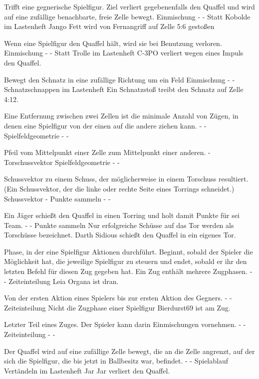 {Trifft eine gegnerische Spielfigur. Ziel verliert gegebenenfalls den Quaffel und wird auf eine zufällige benachbarte, freie Zelle bewegt.}
{Einmischung}
{-}
{-}
{Statt \glqq{}Kobolde\grqq{}  im Lastenheft}
{Jango Fett wird von Fernangriff auf Zelle 5:6 gestoßen}

{Wenn eine Spielfigur den Quaffel hält, wird sie bei Benutzung verloren.}
{Einmischung}
{-}
{-}
{Statt \glqq{}Trolle\grqq{}  im Lastenheft}
{C-3PO verliert wegen eines Impuls den Quaffel.}

{Bewegt den Schnatz in eine zufällige Richtung um ein Feld}
{Einmischung}
{-}
{-}
{\glqq{}Schnatzschnappen\grqq{}  im Lastenheft}
{Ein Schnatzstoß treibt den Schnatz auf Zelle 4:12.}

{Eine Entfernung zwischen zwei Zellen ist die minimale Anzahl von Zügen, in denen eine Spielfigur von der einen auf die andere ziehen kann.}
{-}
{-}
{Spielfeldgeometrie}
{-}
{-}

{Pfeil vom Mittelpunkt einer Zelle zum Mittelpunkt einer anderen.}
{-}
{Torschussvektor}
{Spielfeldgeometrie}
{-}
{-}

{Schussvektor zu einem Schuss, der möglicherweise in einem Torschuss resultiert. (Ein Schussvektor, der die linke oder rechte Seite eines Torrings schneidet.)}
{Schussvektor}
{-}
{Punkte sammeln}
{-}
{-}

{Ein Jäger schießt den Quaffel in einen Torring und holt damit Punkte für sei Team.}
{-}
{-}
{Punkte sammeln}
{Nur erfolgreiche Schüsse auf das Tor werden als Torschüsse bezeichnet.}
{Darth Sidious schießt den Quaffel in ein eigenes Tor.}

{Phase, in der eine Spielfigur Aktionen durchführt. Beginnt, sobald der Spieler die Möglichkeit hat, die jeweilige Spielfigur zu steuern und endet, sobald er ihr den letzten Befehl für diesen Zug gegeben hat. Ein Zug enthält mehrere Zugphasen.}
{-}
{-}
{Zeiteinteilung}
{}
{Leia Organa ist dran.}

{Von der ersten Aktion eines Spielers bis zur ersten Aktion des Gegners.}
{-}
{-}
{Zeiteinteilung}
{Nicht die Zugphase einer Spielfigur}
{Bierdurst69 ist am Zug.}

{Letzter Teil eines Zuges. Der Spieler kann darin Einmischungen vornehmen.}
{-}
{-}
{Zeiteinteilung}
{-}
{-}

{Der Quaffel wird auf eine zufällige Zelle bewegt, die an die Zelle angrenzt, auf der sich die Spielfigur, die bis jetzt in Ballbesitz war, befindet.}
{-}
{-}
{Spielablauf}
{\glqq{}Vertändeln\grqq{}  im Lastenheft}
{Jar Jar verliert den Quaffel.}

